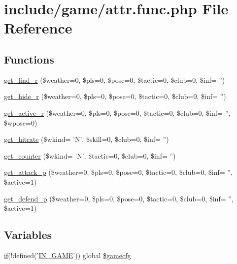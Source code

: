 \hypertarget{attr_8func_8php}{\section{include/game/attr.func.\+php File Reference}
\label{attr_8func_8php}
}
\subsection*{Functions}
\begin{DoxyCompactItemize}
\item 
\hyperlink{attr_8func_8php_ae4e28a056dddd4ae29e2ca22de81b193}{get\+\_\+find\+\_\+r} (\$weather=0, \$pls=0, \$pose=0, \$tactic=0, \$club=0, \$inf= '')
\item 
\hyperlink{attr_8func_8php_ada2bfa61ecfa523dfbff15fcf7ecb3ea}{get\+\_\+hide\+\_\+r} (\$weather=0, \$pls=0, \$pose=0, \$tactic=0, \$club=0, \$inf= '')
\item 
\hyperlink{attr_8func_8php_ace64c210a9114d8fd3fffd9508bf2acd}{get\+\_\+active\+\_\+r} (\$weather=0, \$pls=0, \$pose=0, \$tactic=0, \$club=0, \$inf= '', \$wpose=0)
\item 
\hyperlink{attr_8func_8php_ad73dd5baca4d98ace50521e65a4f03f4}{get\+\_\+hitrate} (\$wkind= 'N', \$skill=0, \$club=0, \$inf= '')
\item 
\hyperlink{attr_8func_8php_a20d0c8f330916bbed27926f6de6399f4}{get\+\_\+counter} (\$wkind= 'N', \$tactic=0, \$club=0, \$inf= '')
\item 
\hyperlink{attr_8func_8php_a8f44a755812b52475621143eccd667d8}{get\+\_\+attack\+\_\+p} (\$weather=0, \$pls=0, \$pose=0, \$tactic=0, \$club=0, \$inf= '', \$active=1)
\item 
\hyperlink{attr_8func_8php_a06e630524bebb79766ac3472cf6c8b82}{get\+\_\+defend\+\_\+p} (\$weather=0, \$pls=0, \$pose=0, \$tactic=0, \$club=0, \$inf= '', \$active=1)
\end{DoxyCompactItemize}
\subsection*{Variables}
\begin{DoxyCompactItemize}
\item 
\hyperlink{login__old_8php_a4ac1118c2e44c513a674bc1793ba6c90}{if}(!defined('\hyperlink{templates_2install_8php_a12c82f3d28569a3f80804f1e72cef14c}{I\+N\+\_\+\+G\+A\+M\+E}')) global \hyperlink{attr_8func_8php_a33d55b2aac796af58f594aad39376cbe}{\$gamecfg}
\end{DoxyCompactItemize}


